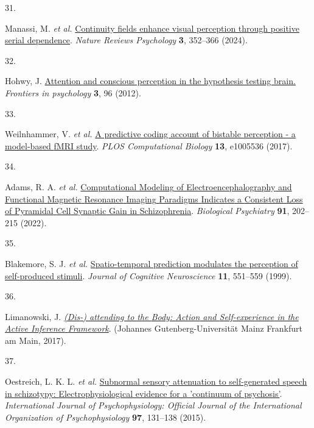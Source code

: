 \documentclass[
]{article}
\newlength{\cslhangindent}
\newlength{\csllabelwidth}
\newenvironment{CSLReferences}[2] %
 {\begin{list}{}{%
  \setlength{\itemindent}{0pt}
  \setlength{\leftmargin}{0pt}
  \setlength{\parsep}{0pt}
  \ifodd #1
   \setlength{\leftmargin}{\cslhangindent}
   \setlength{\itemindent}{-1\cslhangindent}
  \fi
  \setlength{\itemsep}{#2\baselineskip}}}
 {\end{list}}
\newcommand{\CSLLeftMargin}[1]{\parbox[t]{\csllabelwidth}{\strut#1\strut}}
\newcommand{\CSLRightInline}[1]{\parbox[t]{\linewidth - \csllabelwidth}{\strut#1\strut}}
\begin{document}
\begin{CSLReferences}{0}{0}
\CSLLeftMargin{31. }%
\CSLRightInline{Manassi, M. \emph{et al.}
\href{https://doi.org/10.1038/s44159-024-00297-x}{Continuity fields
enhance visual perception through positive serial dependence}.
\emph{Nature Reviews Psychology} \textbf{3}, 352--366 (2024).}

\CSLLeftMargin{32. }%
\CSLRightInline{Hohwy, J.
\href{https://doi.org/10.3389/fpsyg.2012.00096}{Attention and conscious
perception in the hypothesis testing brain.} \emph{Frontiers in
psychology} \textbf{3}, 96 (2012).}

\CSLLeftMargin{33. }%
\CSLRightInline{Weilnhammer, V. \emph{et al.}
\href{https://doi.org/10.1371/journal.pcbi.1005536}{A predictive coding
account of bistable perception - a model-based {fMRI} study}. \emph{PLOS
Computational Biology} \textbf{13}, e1005536 (2017).}

\CSLLeftMargin{34. }%
\CSLRightInline{Adams, R. A. \emph{et al.}
\href{https://doi.org/10.1016/j.biopsych.2021.07.024}{Computational
{Modeling} of {Electroencephalography} and {Functional} {Magnetic}
{Resonance} {Imaging} {Paradigms} {Indicates} a {Consistent} {Loss} of
{Pyramidal} {Cell} {Synaptic} {Gain} in {Schizophrenia}}.
\emph{Biological Psychiatry} \textbf{91}, 202--215 (2022).}

\CSLLeftMargin{35. }%
\CSLRightInline{Blakemore, S. J. \emph{et al.}
\href{https://doi.org/10.1162/089892999563607}{Spatio-temporal
prediction modulates the perception of self-produced stimuli}.
\emph{Journal of Cognitive Neuroscience} \textbf{11}, 551--559 (1999).}

\CSLLeftMargin{36. }%
\CSLRightInline{Limanowski, J.
\emph{\href{https://openscience.ub.uni-mainz.de/handle/20.500.12030/643}{({Dis}-)
attending to the {Body}: {Action} and {Self}-experience in the {Active}
{Inference} {Framework}}}. (Johannes Gutenberg-Universität Mainz
Frankfurt am Main, 2017).}

\CSLLeftMargin{37. }%
\CSLRightInline{Oestreich, L. K. L. \emph{et al.}
\href{https://doi.org/10.1016/j.ijpsycho.2015.05.014}{Subnormal sensory
attenuation to self-generated speech in schizotypy:
{Electrophysiological} evidence for a 'continuum of psychosis'}.
\emph{International Journal of Psychophysiology: Official Journal of the
International Organization of Psychophysiology} \textbf{97}, 131--138
(2015).}


\end{CSLReferences}
\end{document}
